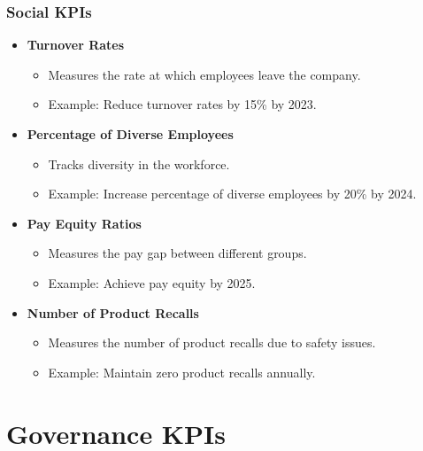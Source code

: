 \documentclass{beamer}
\begin{document}
\begin{frame}
\frametitle{Social KPIs}
\begin{itemize}
    \item \textbf{Turnover Rates}
        \begin{itemize}
            \item Measures the rate at which employees leave the company.
            \item Example: Reduce turnover rates by 15\% by 2023.
        \end{itemize}
    \item \textbf{Percentage of Diverse Employees}
        \begin{itemize}
            \item Tracks diversity in the workforce.
            \item Example: Increase percentage of diverse employees by 20\% by 2024.
        \end{itemize}
    \item \textbf{Pay Equity Ratios}
        \begin{itemize}
            \item Measures the pay gap between different groups.
            \item Example: Achieve pay equity by 2025.
        \end{itemize}
    \item \textbf{Number of Product Recalls}
        \begin{itemize}
            \item Measures the number of product recalls due to safety issues.
            \item Example: Maintain zero product recalls annually.
        \end{itemize}
\end{itemize}
\end{frame}

\section{Governance KPIs}
\end{document}
